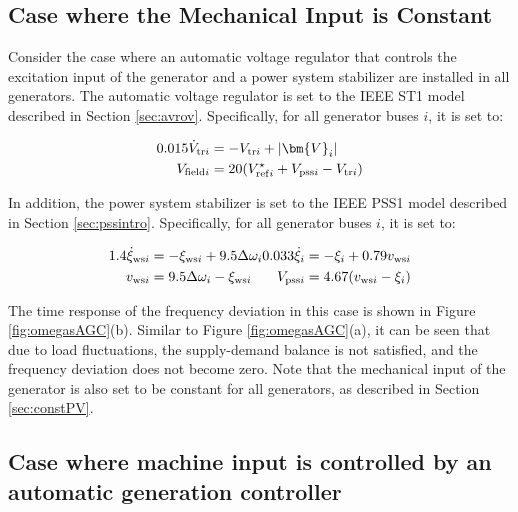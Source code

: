\documentclass[graybox, envcountchap]{svmult}
\begin{document}
\subsection{Case where the Mechanical Input is Constant}\label{sec:onlyAVR}

Consider the case where an automatic voltage regulator that controls the
excitation input of the generator and a power system stabilizer are installed in
all generators. The automatic voltage regulator is set to the IEEE ST1 model
described in Section \ref{sec:avrov}.  Specifically, for all generator buses
$i$, it is set to:

\begin{equation*}
  \begin{aligned}
    0.015 \dot{V}_{{\rm tr}i} & = - V_{{\rm tr} i} +  |\bm{V}_i|  \\
    V_{{\rm field}i} &= 20 ( V_{{\rm ref}i}^{\star} + V_{{\rm pss}i}- V_{{\rm tr}i} )
  \end{aligned}
\end{equation*}

In addition, the power system stabilizer is set to the IEEE PSS1 model described
in Section \ref{sec:pssintro}. Specifically, for all generator buses $i$, it is
set to:

\begin{equation*}
  \begin{aligned}
    1.4 \dot{\xi}_{{\rm ws}i} &=
    - \xi_{{\rm ws}i}
    + 9.5 \Delta \omega_i \\
    v_{{\rm ws}i} &= 9.5 \Delta \omega_i - \xi_{{\rm ws}i}
  \end{aligned}
  \begin{aligned}
    0.033 \dot{\xi}_{i} &=
    - \xi_{i}
    + 0.79 %
    v_{{\rm ws}i} \\
    V_{{\rm pss}i} &= 4.67 ( v_{{\rm ws}i} - \xi_{i} )
  \end{aligned}
\end{equation*}

The time response of the frequency deviation in this case is shown in Figure
\ref{fig:omegasAGC}(b). Similar to Figure \ref{fig:omegasAGC}(a), it can be seen
that due to load fluctuations, the supply-demand balance is not satisfied, and
the frequency deviation does not become zero.  Note that the mechanical input of
the generator is also set to be constant for all generators, as described in
Section \ref{sec:constPV}.

\subsection{Case where machine input is controlled by an automatic generation controller}
\end{document}
